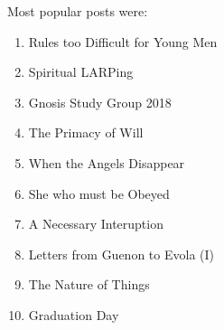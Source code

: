 Most popular posts were:

\begin{enumerate}
\item Rules too Difficult for Young Men

\item Spiritual LARPing

\item Gnosis Study Group 2018

\item The Primacy of Will

\item When the Angels Disappear

\item She who must be Obeyed

\item A Necessary Interuption

\item Letters from Guenon to Evola (I)

\item The Nature of Things

\item Graduation Day
\end{enumerate}




